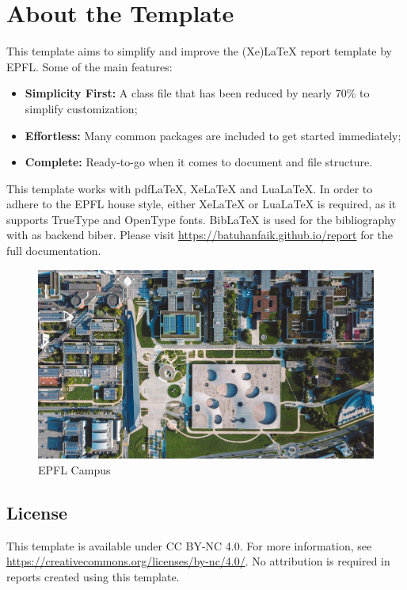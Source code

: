 \chapter{About the Template}

This template aims to simplify and improve the (Xe)LaTeX report template by EPFL. Some of the main features:

\begin{itemize}
  \item \textbf{Simplicity First:} A class file that has been reduced by nearly 70\% to simplify customization;
  \item \textbf{Effortless:} Many common packages are included to get started immediately;
  \item \textbf{Complete:} Ready-to-go when it comes to document and file structure.
\end{itemize}

\noindent This template works with pdfLaTeX, XeLaTeX and LuaLaTeX. In order to adhere to the EPFL house style, either XeLaTeX or LuaLaTeX is required, as it supports TrueType and OpenType fonts. BibLaTeX is used for the bibliography with as backend biber. Please visit \url{https://batuhanfaik.github.io/report} for the full documentation.

\begin{figure}[h]
    \centering
    \includegraphics[width=0.95\linewidth]{figures/campus.jpg}
    \caption{EPFL Campus}
\end{figure}

\section*{License}

\noindent This template is available under CC BY-NC 4.0. For more information, see \url{https://creativecommons.org/licenses/by-nc/4.0/}. No attribution is required in reports created using this template.
